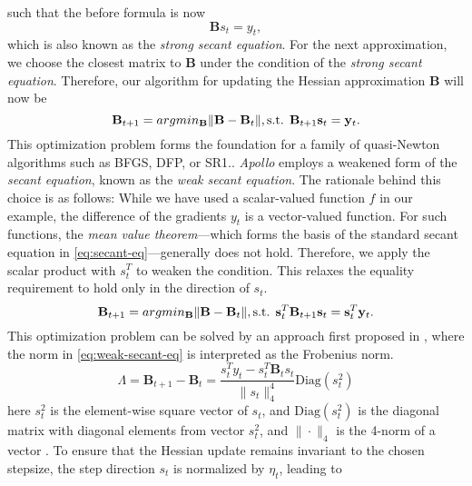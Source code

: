 such that the before formula is now
\label{eq:secant-eq}
\begin{equation}
    \mathbf{B}s_t = y_t,
\end{equation}
which is also known as the \emph{strong secant equation}. For the next approximation, we choose the
closest matrix to $\mathbf{B}$ under the condition of the \emph{strong secant equation}.
Therefore, our algorithm for updating
the Hessian approximation $\mathbf{B}$ will now be 
\begin{equation}
    \mathbf{B}_{t+1} = argmin_{\mathbf{B}} \|\mathbf{B} - \mathbf{B}_t\|,\\
    \text{s.t. }  \mathbf{B}_{t+1}\mathbf{s}_t = \mathbf{y}_t.
\end{equation}
This optimization problem forms the foundation for a family of quasi-Newton algorithms
such as BFGS\cite{BFGS}, DFP\cite{DFP}, or SR1\cite{SR1}.\cite{apollo}.
\emph{Apollo} employs a weakened form of the \emph{secant equation}, known as the \emph{weak secant equation}. The rationale behind this choice is as follows:
While we have used a scalar-valued function $f$ in our example, the difference of the gradients $y_t$
is a vector-valued function. For such functions, the \emph{mean value theorem}—which forms the basis of the standard secant equation in \ref{eq:secant-eq}—generally does not hold\cite{apollo}. 
Therefore, we apply the scalar product with $s_t^T$ to weaken the condition. This relaxes the equality requirement to hold only in the direction of $s_t$.
\begin{equation}
    \label{eq:weak-secant-eq}
    \mathbf{B}_{t+1} = argmin_{\mathbf{B}} \|\mathbf{B} - \mathbf{B}_t\|, \\
    \text{s.t. } \mathbf{s}^T_t \mathbf{B}_{t+1}\mathbf{s}_t =\mathbf{s}^T_t \mathbf{y}_t.
\end{equation}
This optimization problem can be solved by an approach first proposed in \cite{Zhu1999TheQR},
where the norm in \ref{eq:weak-secant-eq} is interpreted as the Frobenius norm.
\begin{equation}
    \label{eq:apollo-update}
    \Lambda= \mathbf{B}_{t+1} - \mathbf{B}_t = \frac{s_t^T y_t - s_t^T \mathbf{B}_t s_t}{\|s_t\|_4^4} \text{Diag}(s_t^2)
\end{equation}
here $s_t^2$ is the element-wise square vector of $s_t$, and $\text{Diag}(s_t^2)$ is the diagonal matrix with diagonal elements from vector $s_t^2$, and $\|\cdot\|_4$ is the 4-norm of a vector \cite{apollo}.
To ensure that the Hessian update remains invariant to the chosen stepsize, the step direction \( s_t \) is normalized by \( \eta_t \), leading to
